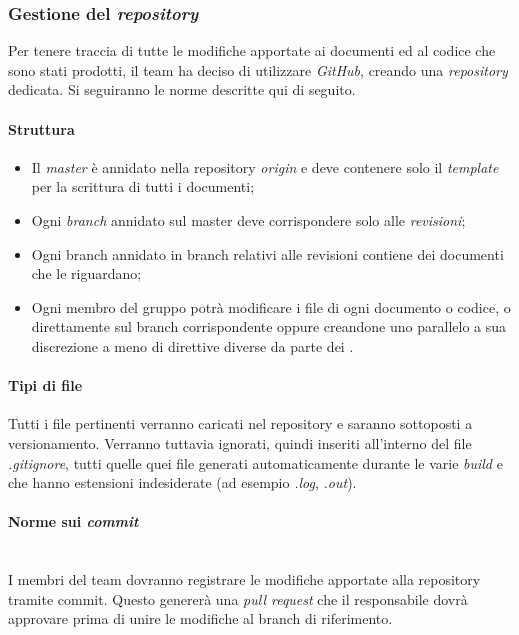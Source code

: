 	
		\subsubsection{Gestione del \emph{repository}}
		Per tenere traccia di tutte le modifiche apportate ai documenti ed al codice che sono stati prodotti, il team ha deciso di utilizzare \emph{GitHub}, creando una \emph{repository} dedicata. Si seguiranno le norme descritte qui di seguito.
			\paragraph{Struttura}
			\begin{itemize}
				\item Il \emph{master} è annidato nella repository \emph{origin} e deve contenere solo il \emph{template} per la scrittura di tutti i documenti;
				\item Ogni \emph{branch} annidato sul master deve corrispondere solo alle \emph{revisioni};
				\item Ogni branch annidato in branch relativi alle revisioni contiene dei documenti che le riguardano;
				\item Ogni membro del gruppo potrà modificare i file di ogni documento o codice, o direttamente sul branch corrispondente oppure creandone uno parallelo a sua discrezione a meno di direttive diverse da parte dei \progs{}.
			\end{itemize}
			\paragraph{Tipi di file}
			Tutti i file pertinenti verranno caricati nel repository e saranno sottoposti a versionamento. Verranno tuttavia ignorati, quindi inseriti all'interno del file \emph{.gitignore}, tutti quelle quei file generati automaticamente durante le varie \emph{build} e che hanno estensioni indesiderate (ad esempio \emph{.log}, \emph{ .out}). 
			\paragraph{Norme sui \emph{commit}}
			~\\I membri del team dovranno registrare le modifiche apportate alla repository tramite commit. Questo genererà una \emph{pull request} che il responsabile dovrà approvare prima di unire le modifiche al branch di riferimento. %
